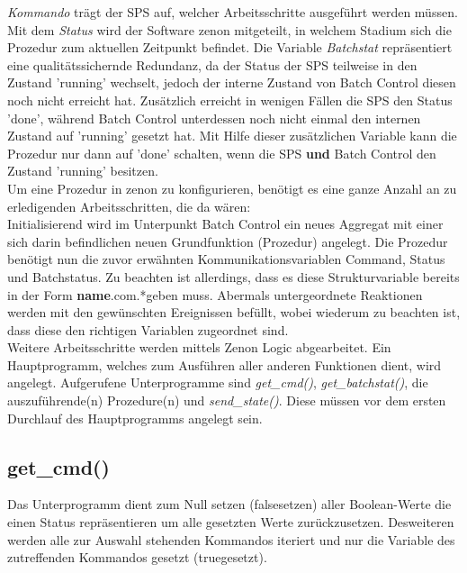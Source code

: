 	\textit{Kommando} trägt der SPS auf, welcher Arbeitsschritte ausgeführt werden müssen. Mit dem \textit{Status} wird der Software zenon mitgeteilt, in welchem Stadium sich die Prozedur zum aktuellen Zeitpunkt befindet. Die Variable \textit{Batchstat} repräsentiert eine qualitätssichernde Redundanz, da der Status der SPS teilweise in den Zustand 'running' wechselt, jedoch der interne Zustand von Batch Control diesen noch nicht erreicht hat. Zusätzlich erreicht in wenigen Fällen die SPS den Status 'done', während Batch Control unterdessen noch nicht einmal den internen Zustand auf 'running' gesetzt hat. Mit Hilfe dieser zusätzlichen Variable kann die Prozedur nur dann auf 'done' schalten, wenn die SPS \textbf{und} Batch Control den Zustand 'running' besitzen.\\
	
	Um eine Prozedur in zenon zu konfigurieren, benötigt es eine ganze Anzahl an zu erledigenden Arbeitsschritten, die da wären:\\

	Initialisierend wird im Unterpunkt Batch Control ein neues Aggregat mit einer sich darin befindlichen neuen Grundfunktion (Prozedur) angelegt. Die Prozedur benötigt nun die zuvor erwähnten Kommunikationsvariablen Command, Status und Batchstatus. Zu beachten ist allerdings, dass es diese Strukturvariable bereits in der Form \glqq \textbf{name}.com.*\grqq \space geben muss. Abermals untergeordnete Reaktionen werden mit den gewünschten Ereignissen befüllt, wobei wiederum zu beachten ist, dass diese den richtigen Variablen zugeordnet sind.\\

	Weitere Arbeitsschritte werden mittels Zenon Logic abgearbeitet. Ein Hauptprogramm, welches zum Ausführen aller anderen Funktionen dient, wird angelegt. Aufgerufene Unterprogramme sind \textit{get\_cmd()}, \textit{get\_batchstat()}, die auszuführende(n) Prozedure(n) und \textit{send\_state()}. Diese müssen vor dem ersten Durchlauf des Hauptprogramms angelegt sein.\\
	
	\subsection{get\_cmd()}
	Das Unterprogramm dient zum Null setzen (\glqq false\grqq \space setzen) aller Boolean-Werte die einen Status repräsentieren um alle gesetzten Werte zurückzusetzen. Desweiteren werden alle zur Auswahl stehenden Kommandos iteriert und nur die Variable des zutreffenden Kommandos gesetzt (\glqq true\grqq \space gesetzt).

